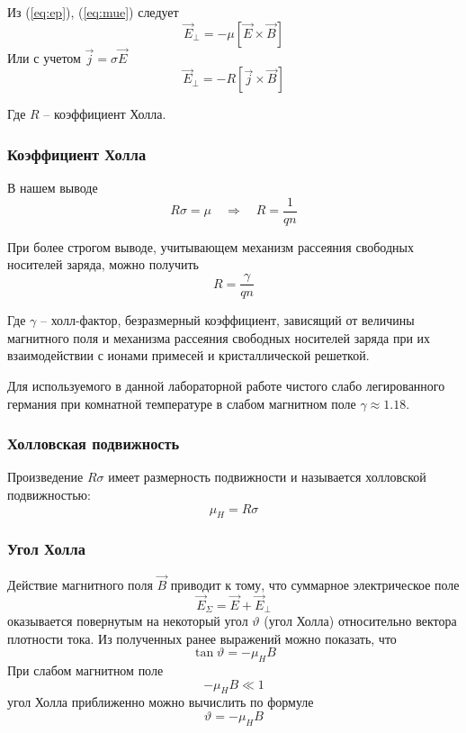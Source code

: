 Из (\ref{eq:ep}), (\ref{eq:mue}) следует
\begin{equation}
	\label{eq10}
	\vec{E}_\perp=-\mu[\vec{E}\times\vec{B}]
\end{equation}
Или с учетом $\vec{j}=\sigma\vec{E}$
\begin{equation}
	\vec{E}_\perp=-R[\vec{j}\times\vec{B}]
\end{equation}

Где $R$ -- коэффициент Холла.

\subsubsection{Коэффициент Холла}
В нашем выводе
\begin{equation}
	R\sigma=\mu
	\quad \Rightarrow\quad
	R=\frac{1}{qn}
\end{equation}

При более строгом выводе, учитывающем механизм рассеяния свободных носителей заряда, можно получить 
\begin{equation}
	R=\frac{\gamma}{qn}
\end{equation}

Где $\gamma$ -- холл-фактор, безразмерный коэффициент, зависящий от величины магнитного поля и механизма рассеяния свободных носителей заряда при их взаимодействии с ионами примесей и кристаллической решеткой. 

Для используемого в данной лабораторной работе чистого слабо легированного германия при комнатной температуре в слабом магнитном поле $\gamma\approx 1.18$.

\subsubsection{Холловская подвижность}

Произведение $R\sigma$ имеет размерность подвижности и называется холловской подвижностью:
\begin{equation}
	\mu_H=R\sigma
\end{equation}

\subsubsection{Угол Холла}

Действие магнитного поля $\vec{B}$ приводит к тому, что суммарное электрическое поле 
\begin{equation}
	\vec{E}_\Sigma=\vec{E}+\vec{E}_\perp
\end{equation}
оказывается повернутым на некоторый угол $\vartheta$ (угол Холла) относительно вектора плотности тока. Из полученных ранее выражений можно показать, что
\begin{equation}
	\tan\vartheta=-\mu_H B
\end{equation}
При слабом магнитном поле 
\begin{equation}
	-\mu_H B \ll 1
\end{equation}
 угол Холла приближенно можно вычислить по формуле 
\begin{equation}
	\vartheta=-\mu_H B
\end{equation}

